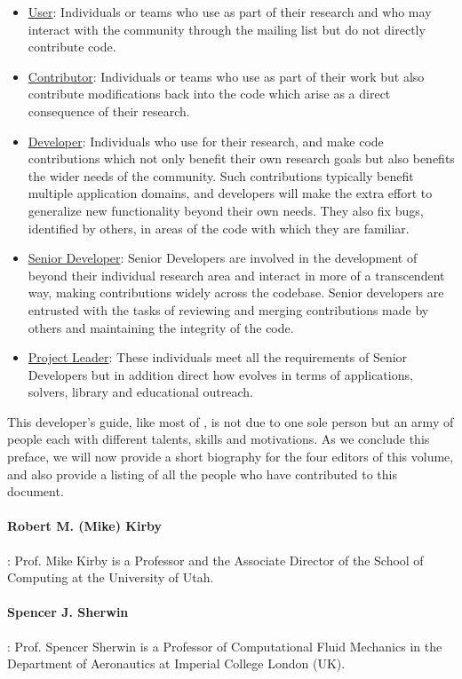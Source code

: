 \begin{itemize}
\item \underline{User}: Individuals or teams who use \nek{} as part of their research and who may interact with the community through the mailing list but do not directly contribute code.
%
\item \underline{Contributor}: Individuals or teams who use \nek{} as part of their work but also contribute modifications back into the code which arise as a direct consequence of their research.
%
\item \underline{Developer}: Individuals who use \nek{} for their research, and make code contributions which not only benefit their own research goals but also benefits the wider needs of the \nek{} community. Such contributions typically benefit multiple application domains, and developers will make the extra effort to generalize new functionality beyond their own needs. They also fix bugs, identified by others, in areas of the code with which they are familiar.
%
\item \underline{Senior Developer}: Senior Developers are involved in the development of \nek{} beyond their individual research area and interact in more of a transcendent way, making contributions widely across the codebase.  Senior developers are entrusted with the tasks of reviewing and merging contributions made by others and maintaining the integrity of the code.
%
\item \underline{Project Leader}: These individuals meet all the requirements of Senior Developers but in addition direct how \nek{} evolves in terms of applications, solvers, library and educational outreach.
\end{itemize}

This developer's guide, like most of \nek{}, is not due to one sole person but an army of people each with different talents, skills and motivations.  As we conclude this preface, we will now provide a short biography for the four editors of this volume, and also provide a listing of all the people who have contributed to this document.

\paragraph{Robert M. (Mike) Kirby}: Prof. Mike Kirby is a Professor and the Associate Director of the School of Computing at the University of Utah.

\paragraph{Spencer J. Sherwin}: Prof. Spencer Sherwin is a Professor of Computational Fluid Mechanics in the Department of Aeronautics at Imperial
College London (UK).

